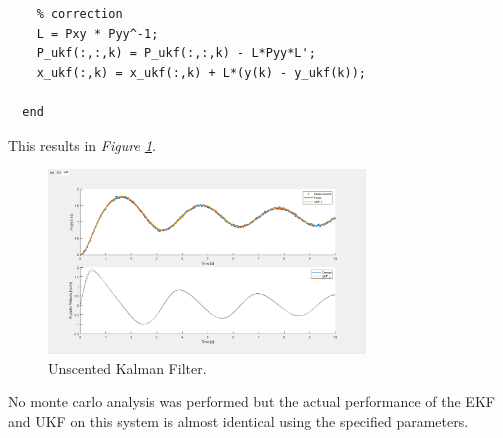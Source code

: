 \documentclass[10pt]{article}
\begin{document}
\begin{enumerate}[label=\textbf{\arabic*.}]
\begin{lstlisting}
    % correction
    L = Pxy * Pyy^-1;
    P_ukf(:,:,k) = P_ukf(:,:,k) - L*Pyy*L';
    x_ukf(:,k) = x_ukf(:,k) + L*(y(k) - y_ukf(k));

  end
  \end{lstlisting}

  This results in \emph{Figure \ref{fig:3}}.

  \begin{figure}[H]
    \centering
    \includegraphics[width=0.75\textwidth]{p1_ukf.png}
    \caption{Unscented Kalman Filter.}
    \label{fig:3}
  \end{figure}

  No monte carlo analysis was performed but the actual performance of the EKF 
  and UKF on this system is almost identical using the specified parameters.

  \vspace{24pt}


\end{enumerate}
\end{document}
